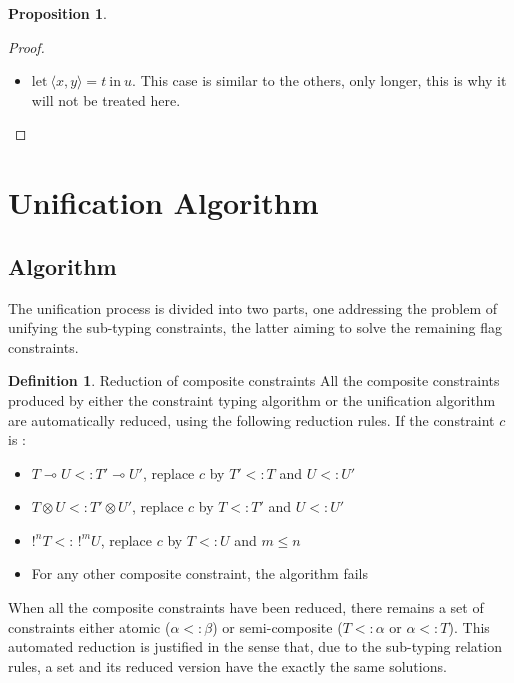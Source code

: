 \documentclass[9pt]{article}
\theoremstyle{plain}
\theoremstyle{definition}
\newtheorem{defn}{Definition}[subsection] %
\newtheorem{prop}{Proposition}[section]
\newcommand{\pair}[2]{\langle #1, #2 \rangle}
\begin{document}
\begin{prop}
\begin{proof}
\begin{itemize}
			\item $\text{let}~ \pair{x}{y} = t ~\text{in}~ u$.
				This case is similar to the others, only longer, this is why it will not be treated here.
		\end{itemize}
	\end{proof}
\end{prop}

\section{Unification Algorithm}

\subsection{Algorithm}

The unification process is divided into two parts, one addressing the problem of unifying the sub-typing constraints,
the latter aiming to solve the remaining flag constraints.

\begin{defn}{Reduction of composite constraints}
	All the composite constraints produced by either the constraint typing
  algorithm or the unification algorithm are automatically reduced, using the following reduction rules.
  If the constraint $c$ is :
  	\begin{itemize}
      \item $T \multimap U <: T' \multimap U'$, replace $c$ by $T' <: T$ and $U <: U'$
      \item $T \otimes U <: T' \otimes U'$, replace $c$ by $T <: T'$ and $U <: U'$
      \item $!^n T <: \, !^m U$, replace $c$ by $T <: U$ and $m \le n$
      \item For any other composite constraint, the algorithm fails
    \end{itemize}
  When all the composite constraints have been reduced, there remains a set of constraints either atomic ($\alpha <: \beta$) or
  semi-composite ($T <: \alpha$ or $\alpha <: T$).
  This automated reduction is justified in the sense that, due to the sub-typing relation rules, a set and its reduced version
  have the exactly the same solutions.
\end{defn}
\end{document}
